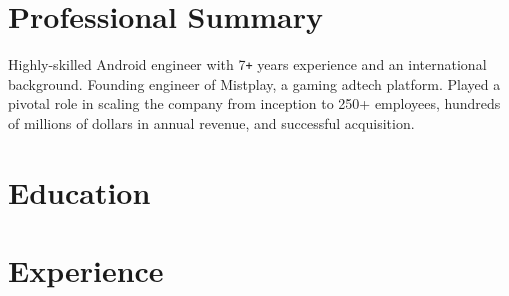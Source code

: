 \documentclass[10pt,a4paper,sans]{moderncv} %
\newcommand{\vs}[0]{\smallskip}
\begin{document}
\makecvtitle %
\vspace{-0.9cm}


\section{Professional Summary}
\vspace{-0.8mm}
Highly-skilled Android engineer with 7\texttt{+} years experience and an international background. Founding engineer of Mistplay, a gaming adtech platform. Played a pivotal role in scaling the company from inception to 250+ employees, hundreds of millions of dollars in annual revenue, and successful acquisition. 


\section{Education}



\section{Experience}

\end{document}
